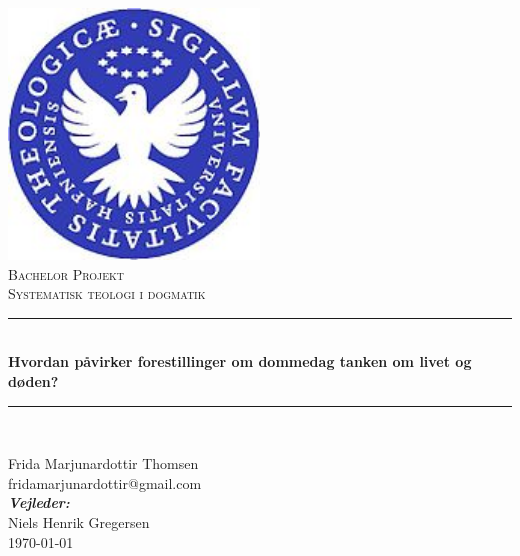 \begin{titlepage}
\newcommand{\HRule}{\rule{\linewidth}{0.5mm}} %

\center %
 

\includegraphics[width=0.5\textwidth]{logo.jpg}\\[1cm] %

\vspace{1 cm}
\textsc{\LARGE Bachelor Projekt} \\[0.4cm] %
\textsc{\large Systematisk teologi i dogmatik} \\
\vspace{1 cm}
\HRule \\[1.0cm]
{ \LARGE \textbf{Hvordan påvirker forestillinger om dommedag tanken om livet og døden?} \small \vspace{0.4cm}}\\ %
\HRule \\[1.0cm]
 
\center

\LARGE Frida Marjunardottir Thomsen \\
\vspace{0.2 cm}
\small fridamarjunardottir@gmail.com \\
\vspace{1 cm}
\large
\emph{\large \textbf{Vejleder:}} \\
Niels Henrik Gregersen\\
\vspace{1.5 cm}
{\large \today}\\[3cm] %
\end{titlepage}

